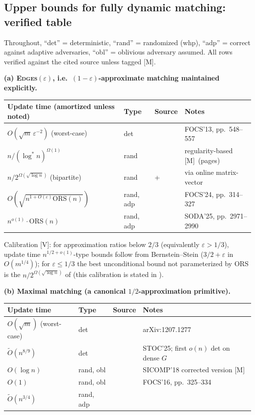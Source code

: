\documentclass[11pt]{article}
\theoremstyle{definition}
\theoremstyle{remark}
\newcommand{\statusV}{\textcolor{green!45!black}{\textsf{[V]}}}
\newcommand{\statusM}{\textcolor{orange!80!black}{\textsf{[M]}}}
\newcommand{\ORS}{\mathrm{ORS}}
\newcommand{\eps}{\varepsilon}
\newcommand{\Otil}{\widetilde{O}}
\begin{document}
\subsection{Upper bounds for fully dynamic matching: verified table}
\label{sec:ub-table}

Throughout, ``det'' = deterministic, ``rand'' = randomized (whp),
``adp'' = correct against adaptive adversaries, ``obl'' = oblivious
adversary assumed. All rows verified against the cited source unless
tagged \statusM.

\medskip
\noindent\textbf{(a) \textsc{Edges}$(\eps)$, i.e.\ $(1-\eps)$-approximate
matching maintained explicitly.}
\begin{center}
\small
\begin{tabular}{@{}llll@{}}
\toprule
Update time (amortized unless noted) & Type & Source & Notes\\
\midrule
$O(\sqrt{m}\,\eps^{-2})$ (worst-case) & det & \cite{GP13} & FOCS'13, pp.~548--557\\
$n/(\log^* n)^{\Omega(1)}$ & rand & \cite{ABKL23} & regularity-based \statusM\ (pages)\\
$n/2^{\Omega(\sqrt{\log n})}$ (bipartite) & rand & \cite{Liu24}+\cite{LW17} & via online matrix-vector\\
$O(\sqrt{n^{1+O(\eps)}\ORS(n)})$ & rand, adp & \cite{BG24} & FOCS'24, pp.~314--327\\
$n^{o(1)}\cdot\ORS(n)$ & rand, adp & \cite{AKK25} & SODA'25, pp.~2971--2990\\
\bottomrule
\end{tabular}
\end{center}

\noindent Calibration \statusV: for approximation ratios below $2/3$
(equivalently $\eps>1/3$), update time $n^{1/2+o(1)}$-type bounds follow
from Bernstein--Stein \cite{BS16} ($3/2+\eps$ in $O(m^{1/4})$); for
$\eps\le 1/3$ the best unconditional bound not parameterized by
$\ORS$ is the $n/2^{\Omega(\sqrt{\log n})}$ of \cite{Liu24} (this
calibration is stated in \cite{Pra26}).

\medskip
\noindent\textbf{(b) Maximal matching (a canonical $1/2$-approximation
primitive).}
\begin{center}
\small
\begin{tabular}{@{}llll@{}}
\toprule
Update time & Type & Source & Notes\\
\midrule
$O(\sqrt{m})$ (worst-case) & det & \cite{NS13} & arXiv:1207.1277\\
$\Otil(n^{8/9})$ & det & \cite{BBKS25} & STOC'25; first $o(n)$ det on dense $G$\\
$O(\log n)$ & rand, obl & \cite{BGS11} & SICOMP'18 corrected version \statusM\\
$O(1)$ & rand, obl & \cite{Sol16} & FOCS'16, pp.~325--334\\
$\Otil(n^{3/4})$ & rand, adp & \cite{BBKS25} & \\
\bottomrule
\end{tabular}
\end{center}
\end{document}
